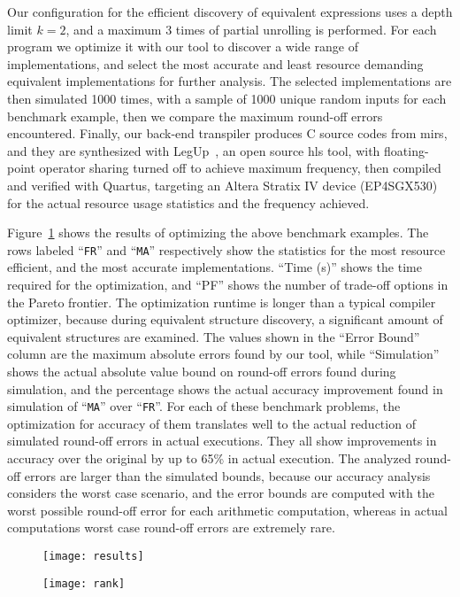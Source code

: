 Our configuration for the efficient discovery of equivalent expressions uses a
depth limit $k = 2$, and a maximum 3 times of partial unrolling is performed.
For each program we optimize it with our tool to discover a wide range of
implementations, and select the most accurate and least resource demanding
equivalent implementations for further analysis.  The selected implementations
are then simulated 1000 times, with a sample of 1000 unique random inputs
for each benchmark example, then we compare the maximum round-off errors
encountered.  Finally, our back-end transpiler produces C source codes from
\glspl{mir}, and they are synthesized with LegUp~\cite{legup}, an open source
\gls{hls} tool, with floating-point operator sharing turned off to achieve
maximum frequency, then compiled and verified with Quartus, targeting an Altera
Stratix IV device (EP4SGX530) for the actual resource usage statistics and the
frequency achieved.

Figure~\ref{po:fig:results} shows the results of optimizing the above benchmark
examples.  The rows labeled ``\texttt{FR}'' and ``\texttt{MA}'' respectively
show the statistics for the most resource efficient, and the most accurate
implementations.  ``Time (s)'' shows the time required for the optimization,
and ``PF'' shows the number of trade-off options in the Pareto frontier.  The
optimization runtime is longer than a typical compiler optimizer, because
during equivalent structure discovery, a significant amount of equivalent
structures are examined.  The values shown in the ``Error Bound'' column are
the maximum absolute errors found by our tool, while ``Simulation'' shows the
actual absolute value bound on round-off errors found during simulation, and
the percentage shows the actual accuracy improvement found in simulation of
``\texttt{MA}'' over ``\texttt{FR}''.  For each of these benchmark problems,
the optimization for accuracy of them translates well to the actual reduction
of simulated round-off errors in actual executions.  They all show improvements
in accuracy over the original by up to 65\% in actual execution.  The analyzed
round-off errors are larger than the simulated bounds, because our accuracy
analysis considers the worst case scenario, and the error bounds are computed
with the worst possible round-off error for each arithmetic computation,
whereas in actual computations worst case round-off errors are extremely rare.

\begin{figure}[ht]
    \centering
    \texttt{[image: results]}
    \label{po:fig:results}
\end{figure}
\begin{figure}[ht]
    \centering
    \texttt{[image: rank]}
    \label{po:fig:rank}
\end{figure}

